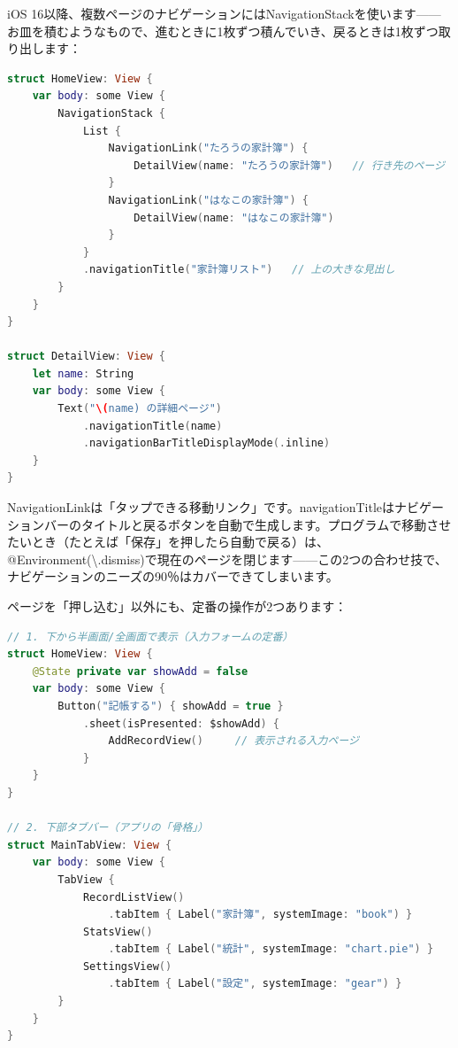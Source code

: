 
iOS 16以降、複数ページのナビゲーションにはNavigationStackを使います——お皿を積むようなもので、進むときに1枚ずつ積んでいき、戻るときは1枚ずつ取り出します：

\begin{lstlisting}[language=Swift]
struct HomeView: View {
    var body: some View {
        NavigationStack {
            List {
                NavigationLink("たろうの家計簿") {
                    DetailView(name: "たろうの家計簿")   // 行き先のページ
                }
                NavigationLink("はなこの家計簿") {
                    DetailView(name: "はなこの家計簿")
                }
            }
            .navigationTitle("家計簿リスト")   // 上の大きな見出し
        }
    }
}

struct DetailView: View {
    let name: String
    var body: some View {
        Text("\(name) の詳細ページ")
            .navigationTitle(name)
            .navigationBarTitleDisplayMode(.inline)
    }
}
\end{lstlisting}

NavigationLinkは「タップできる移動リンク」です。navigationTitleはナビゲーションバーのタイトルと戻るボタンを自動で生成します。プログラムで移動させたいとき（たとえば「保存」を押したら自動で戻る）は、@Environment(\textbackslash{}.dismiss)で現在のページを閉じます——この2つの合わせ技で、ナビゲーションのニーズの90％はカバーできてしまいます。


ページを「押し込む」以外にも、定番の操作が2つあります：

\begin{lstlisting}[language=Swift]
// 1. 下から半画面/全画面で表示（入力フォームの定番）
struct HomeView: View {
    @State private var showAdd = false
    var body: some View {
        Button("記帳する") { showAdd = true }
            .sheet(isPresented: $showAdd) {
                AddRecordView()     // 表示される入力ページ
            }
    }
}

// 2. 下部タブバー（アプリの「骨格」）
struct MainTabView: View {
    var body: some View {
        TabView {
            RecordListView()
                .tabItem { Label("家計簿", systemImage: "book") }
            StatsView()
                .tabItem { Label("統計", systemImage: "chart.pie") }
            SettingsView()
                .tabItem { Label("設定", systemImage: "gear") }
        }
    }
}
\end{lstlisting}

